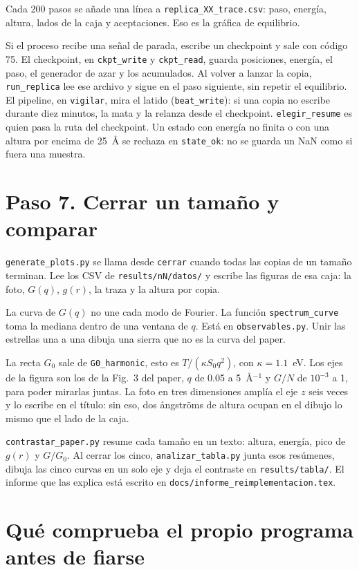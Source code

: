 \documentclass[11pt,a4paper]{article}
\newcommand{\fn}[1]{\texttt{#1}}
\begin{document}
Cada 200 pasos se añade una línea a \fn{replica\_XX\_trace.csv}: paso, energía, altura, lados de la caja y aceptaciones. Eso es la gráfica de equilibrio.

Si el proceso recibe una señal de parada, escribe un checkpoint y sale con código 75. El checkpoint, en \fn{ckpt\_write} y \fn{ckpt\_read}, guarda posiciones, energía, el paso, el generador de azar y los acumulados. Al volver a lanzar la copia, \fn{run\_replica} lee ese archivo y sigue en el paso siguiente, sin repetir el equilibrio. El pipeline, en \fn{vigilar}, mira el latido (\fn{beat\_write}): si una copia no escribe durante diez minutos, la mata y la relanza desde el checkpoint. \fn{elegir\_resume} es quien pasa la ruta del checkpoint. Un estado con energía no finita o con una altura por encima de 25~Å se rechaza en \fn{state\_ok}: no se guarda un NaN como si fuera una muestra.

\section{Paso 7. Cerrar un tamaño y comparar}

\fn{generate\_plots.py} se llama desde \fn{cerrar} cuando todas las copias de un tamaño terminan. Lee los CSV de \fn{results/nN/datos/} y escribe las figuras de esa caja: la foto, $G(q)$, $g(r)$, la traza y la altura por copia.

La curva de $G(q)$ no une cada modo de Fourier. La función \fn{spectrum\_curve} toma la mediana dentro de una ventana de $q$. Está en \fn{observables.py}. Unir las estrellas una a una dibuja una sierra que no es la curva del paper.

La recta $G_0$ sale de \fn{G0\_harmonic}, esto es $T/(\kappa S_0 q^2)$, con $\kappa=1.1$~eV. Los ejes de la figura son los de la Fig.~3 del paper, $q$ de 0.05 a 5~Å$^{-1}$ y $G/N$ de $10^{-3}$ a 1, para poder mirarlas juntas. La foto en tres dimensiones amplía el eje $z$ seis veces y lo escribe en el título: sin eso, dos ångströms de altura ocupan en el dibujo lo mismo que el lado de la caja.

\fn{contrastar\_paper.py} resume cada tamaño en un texto: altura, energía, pico de $g(r)$ y $G/G_0$. Al cerrar los cinco, \fn{analizar\_tabla.py} junta esos resúmenes, dibuja las cinco curvas en un solo eje y deja el contraste en \fn{results/tabla/}. El informe que las explica está escrito en \fn{docs/informe\_reimplementacion.tex}.

\section{Qué comprueba el propio programa antes de fiarse}
\end{document}
